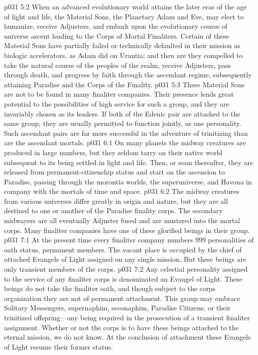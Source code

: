 \vs p031 5:2 When an advanced evolutionary world attains the later eras of the age of light and life, the Material Sons, the Planetary Adam and Eve, may elect to humanize, receive Adjusters, and embark upon the evolutionary course of universe ascent leading to the Corps of Mortal Finaliters. Certain of these Material Sons have partially failed or technically defaulted in their mission as biologic accelerators, as Adam did on Urantia; and then are they compelled to take the natural course of the peoples of the realm, receive Adjusters, pass through death, and progress by faith through the ascendant regime, subsequently attaining Paradise and the Corps of the Finality.\plusone
\vs p031 5:3 These Material Sons are not to be found in many finaliter companies. Their presence lends great potential to the possibilities of high service for such a group, and they are invariably chosen as its leaders. If both of the Edenic pair are attached to the same group, they are usually permitted to function jointly, as one personality. Such ascendant pairs are far more successful in the adventure of trinitizing than are the ascendant mortals.\plusone
{}
\vs p031 6:1 On many planets the midway creatures are produced in large numbers, but they seldom tarry on their native world subsequent to its being settled in light and life. Then, or soon thereafter, they are released from permanent\hyp{}citizenship status and start on the ascension to Paradise, passing through the morontia worlds, the superuniverse, and Havona in company with the mortals of time and space.
\vs p031 6:2 The midway creatures from various universes differ greatly in origin and nature, but they are all destined to one or another of the Paradise finality corps. The secondary midwayers are all eventually Adjuster fused and are mustered into the mortal corps. Many finaliter companies have one of these glorified beings in their group.\plusone
{}
\vs p031 7:1 At the present time every finaliter company numbers 999 personalities of oath status, permanent members. The vacant place is occupied by the chief of attached Evangels of Light assigned on any single mission. But these beings are only transient members of the corps.
\vs p031 7:2 Any celestial personality assigned to the service of any finaliter corps is denominated an Evangel of Light. These beings do not take the finaliter oath, and though subject to the corps organization they are not of permanent attachment. This group may embrace Solitary Messengers, supernaphim, seconaphim, Paradise Citizens, or their trinitized offspring---any being required in the prosecution of a transient finaliter assignment. Whether or not the corps is to have these beings attached to the eternal mission, we do not know. At the conclusion of attachment these Evangels of Light resume their former status.\plusone
